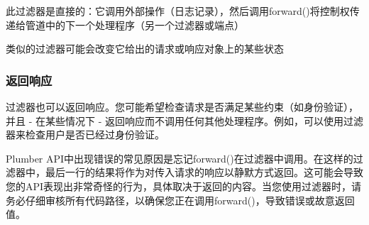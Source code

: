 \documentclass[]{book}
\newenvironment{Shaded}{\begin{snugshade}}{\end{snugshade}}
\newcommand{\KeywordTok}[1]{\textcolor[rgb]{0.13,0.29,0.53}{\textbf{#1}}}
\newcommand{\DataTypeTok}[1]{\textcolor[rgb]{0.13,0.29,0.53}{#1}}
\newcommand{\DecValTok}[1]{\textcolor[rgb]{0.00,0.00,0.81}{#1}}
\newcommand{\StringTok}[1]{\textcolor[rgb]{0.31,0.60,0.02}{#1}}
\newcommand{\CommentTok}[1]{\textcolor[rgb]{0.56,0.35,0.01}{\textit{#1}}}
\newcommand{\ControlFlowTok}[1]{\textcolor[rgb]{0.13,0.29,0.53}{\textbf{#1}}}
\newcommand{\OperatorTok}[1]{\textcolor[rgb]{0.81,0.36,0.00}{\textbf{#1}}}
\newcommand{\NormalTok}[1]{#1}
\begin{document}
此过滤器是直接的：它调用外部操作（日志记录），然后调用forward()将控制权传递给管道中的下一个处理程序（另一个过滤器或端点）

类似的过滤器可能会改变它给出的请求或响应对象上的某些状态

\begin{Shaded}
\end{Shaded}

\subsubsection{返回响应}

过滤器也可以返回响应。您可能希望检查请求是否满足某些约束（如身份验证），并且
- 在某些情况下 -
返回响应而不调用任何其他处理程序。例如，可以使用过滤器来检查用户是否已经过身份验证。

\begin{Shaded}
\end{Shaded}

Plumber
API中出现错误的常见原因是忘记forward()在过滤器中调用。在这样的过滤器中，最后一行的结果将作为对传入请求的响应以静默方式返回。这可能会导致您的API表现出非常奇怪的行为，具体取决于返回的内容。当您使用过滤器时，请务必仔细审核所有代码路径，以确保您正在调用forward()，导致错误或故意返回值。
\end{document}

